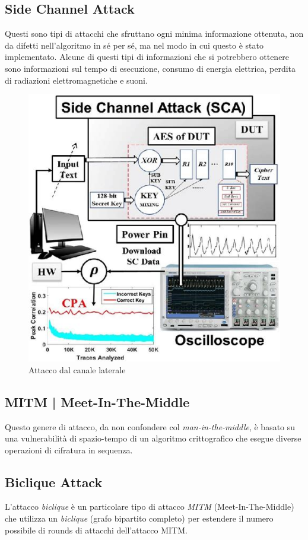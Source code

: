 \textsf{\small }

\subsection{Side Channel Attack}

\textsf{\small Questi sono tipi di attacchi che sfruttano ogni minima informazione ottenuta, non da difetti nell'algoritmo in sé per sé, ma nel modo in cui questo è stato implementato. Alcune di questi tipi di informazioni che si potrebbero ottenere sono informazioni sul tempo di esecuzione, consumo di energia elettrica, perdita di radiazioni elettromagnetiche e suoni.}

\begin{figure}[H]
	\centering
	\includegraphics[width=.6\textwidth, height=.6\textheight, keepaspectratio]{./images/attacks/side_channel_attack.png}
	\caption{Attacco dal canale laterale}
	\label{fig:side_channel_attack}
\end{figure}

\subsection{MITM | Meet-In-The-Middle}

\textsf{\small Questo genere di attacco, da non confondere col \emph{man-in-the-middle}, è basato su una vulnerabilità di spazio-tempo di un algoritmo crittografico che esegue diverse operazioni di cifratura in sequenza.}

\subsection{Biclique Attack}

\textsf{\small L'attacco \emph{biclique} è un particolare tipo di attacco \emph{MITM} (Meet-In-The-Middle) che utilizza un \emph{biclique} (grafo bipartito completo) per estendere il numero possibile di rounds di attacchi dell'attacco MITM.}

